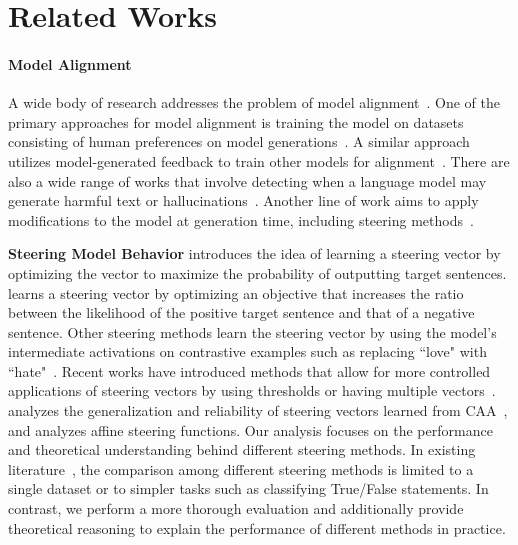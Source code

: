 \section{Related Works}
\paragraph{Model Alignment} A wide body of research addresses the problem of model alignment~\citep{casper2023open, ji2023ai, hendrycks2021unsolved, leike2018scalable}. One of the primary approaches for model alignment is training the model on datasets consisting of human preferences on model generations~\citep{bai2022training, ouyang2022training, christiano2017deep, ziegler2019fine, yuan2023rrhf, rafailov2023direct, dong2023raft, liu2023chain, song2023preference, pal2024smaug, meng2024simpo}. A similar approach utilizes model-generated feedback to train other models for alignment~\citep{bai2022constitutional, lee2023rlaif, burns2023weak}. There are also a wide range of works that involve detecting when a language model may generate harmful text or hallucinations~\citep{du2024haloscope, yi2024jailbreak, jain2023baseline, malinin2020uncertainty, kuhn2023semantic, duan2023shifting, su2024unsupervised, yin2024characterizing, chen2024inside}. Another line of work aims to apply modifications to the model at generation time, including steering methods~\citep{khanov2024alignment, li2024inference, zou2023representation, rimsky-etal-2024-steering, liu2023context, lee2024programming, cao2024nothing, cao2024personalized, stickland2024steering, wang2024adaptive, subramani2022extracting, turner2023activation}. 

\textbf{Steering Model Behavior} \citet{subramani2022extracting} introduces the idea of learning a steering vector by optimizing the vector to maximize the probability of outputting target sentences. \citet{cao2024personalized} learns a steering vector by optimizing an objective that increases the ratio between the likelihood of the positive target sentence and that of a negative sentence. Other steering methods learn the steering vector by using the model's intermediate activations on contrastive examples such as replacing ``love" with ``hate"~\cite{turner2023activation, li2024inference, zou2023representation, rimsky-etal-2024-steering}. Recent works have introduced methods that allow for more controlled applications of steering vectors by using thresholds or having multiple vectors~\citep{lee2024programming, stickland2024steering, wang2024adaptive, cao2024nothing, chu2024causal}. \citet{tan2024analyzing} analyzes the generalization and reliability of steering vectors learned from CAA~\citep{rimsky-etal-2024-steering}, and \citet{singhrepresentation} analyzes affine steering functions. Our analysis focuses on the performance and theoretical understanding behind different steering methods. In existing literature~\citep{marks2023geometry, li2024inference, zou2023representation}, the comparison among different steering methods is limited to a single dataset or to simpler tasks such as classifying True/False statements. In contrast, we perform a more thorough evaluation and additionally provide theoretical reasoning to explain the performance of different methods in practice.